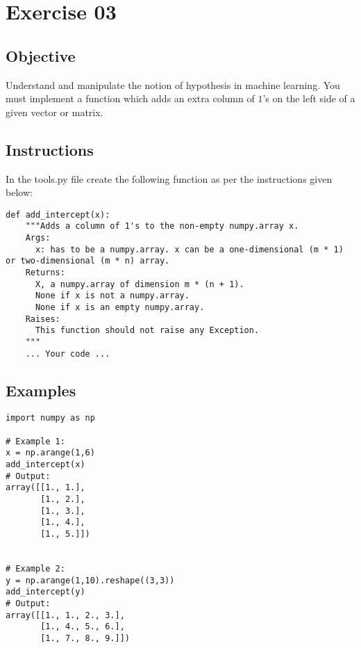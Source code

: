 \chapter{Exercise 03}

\newpage
{}
\makeheaderfilesforbidden

\section*{Objective}
Understand and manipulate the notion of hypothesis in machine learning.
You must implement a function which adds an extra column of $1$'s on the left side of a given vector or matrix.

\section*{Instructions}
In the tools.py file create the following function as per the instructions given below:

\begin{verbatim}
def add_intercept(x):
    """Adds a column of 1's to the non-empty numpy.array x.
    Args:
      x: has to be a numpy.array. x can be a one-dimensional (m * 1) or two-dimensional (m * n) array.
    Returns:
      X, a numpy.array of dimension m * (n + 1).
      None if x is not a numpy.array.
      None if x is an empty numpy.array.
    Raises:
      This function should not raise any Exception.
    """
    ... Your code ...
\end{verbatim}

\section*{Examples}

\begin{verbatim}
import numpy as np

# Example 1:
x = np.arange(1,6)
add_intercept(x)
# Output:
array([[1., 1.],
       [1., 2.],
       [1., 3.],
       [1., 4.],
       [1., 5.]])


# Example 2:
y = np.arange(1,10).reshape((3,3))
add_intercept(y)
# Output:
array([[1., 1., 2., 3.],
       [1., 4., 5., 6.],
       [1., 7., 8., 9.]])
\end{verbatim}

